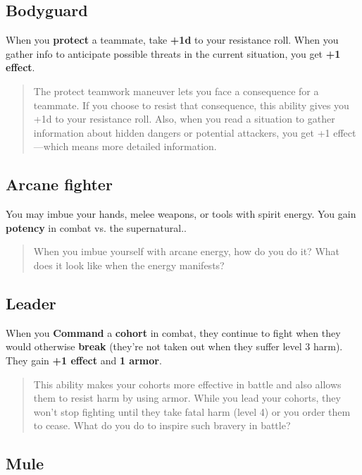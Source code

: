 \documentclass[11pt,oneside]{book}
\newcommand{\gameterm}[1]{\textbf{#1}}
\begin{document}
\subsection{Bodyguard}

When you \textbf{protect} a teammate, take \textbf{+1d} to your resistance roll. When you gather info to anticipate possible threats in the current situation, you get \textbf{+1 effect}.

\begin{quote}
	The protect teamwork maneuver lets you face a consequence for a teammate. If you choose to resist that consequence, this ability gives you +1d to your resistance roll. Also, when you read a situation to gather information about hidden dangers or potential attackers, you get +1 effect---which means more detailed information.
\end{quote}

\subsection{Arcane fighter}

You may imbue your hands, melee weapons, or tools with spirit energy. You gain \textbf{potency} in combat vs. the supernatural..

\begin{quote}
	When you imbue yourself with arcane energy, how do you do it? What does it look like when the energy manifests?
\end{quote} 

\subsection{Leader}

When you \gameterm{Command}  a \textbf{cohort} in combat, they continue to fight when they would otherwise \textbf{break }(they’re not taken out when they suffer level 3 harm). They gain \textbf{+1 effect} and \textbf{1 armor}.

\begin{quote}
	This ability makes your cohorts more effective in battle and also allows them to resist harm by using armor. While you lead your cohorts, they won’t stop fighting until they take fatal harm (level 4) or you order them to cease. What do you do to inspire such bravery in battle?
\end{quote} 

\subsection{Mule}
\end{document}
